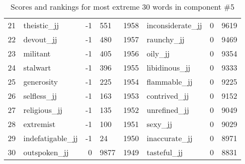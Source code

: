 \begin{table}[tbp]
\begin{tabular}{| rlr@{.}l | rlr@{.}l |}
    21 & theistic\_jj & -1 & 551    &    1958 & inconsiderate\_jj & 0 & 9619 \\
    22 & devout\_jj & -1 & 480    &    1957 & raunchy\_jj & 0 & 9469 \\
    23 & militant & -1 & 405    &    1956 & oily\_jj & 0 & 9354 \\
    24 & stalwart & -1 & 396    &    1955 & libidinous\_jj & 0 & 9333 \\
    25 & generosity & -1 & 225    &    1954 & flammable\_jj & 0 & 9225 \\
    26 & selfless\_jj & -1 & 163    &    1953 & contrived\_jj & 0 & 9152 \\
    27 & religious\_jj & -1 & 135    &    1952 & unrefined\_jj & 0 & 9049 \\
    28 & extremist & -1 & 100    &    1951 & sexy\_jj & 0 & 9029 \\
    29 & indefatigable\_jj & -1 & 24    &    1950 & inaccurate\_jj & 0 & 8971 \\
    30 & outspoken\_jj & 0 & 9877    &    1949 & tasteful\_jj & 0 & 8831 \\
    \hline
    \end{tabular}
    \caption{Scores and rankings for most extreme 30 words in component \#5} 
\end{table}
\clearpage
